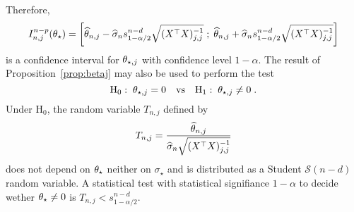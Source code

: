 Therefore, 
\[
I^{n-p}_{n,j}(\theta_{\star}) = \left[\widehat {\theta}_{n,j} -\widehat\sigma_{n}s_{1-\alpha/2}^{n-d}\sqrt{(X^\top X)_{j,j}^{-1}}\;;\; \widehat {\theta}_{n,j} + \widehat\sigma_{n}s_{1-\alpha/2}^{n-d}\sqrt{(X^\top X)_{j,j}^{-1}}\right]
\]
 is a confidence interval for $\theta_{\star,j}$ with confidence level $1-\alpha$. The result of Proposition~\ref{prop:betaj} may also be used to perform the test 
\[
\mathrm{H}_0:\; \theta_{\star,j} = 0 \quad\mathrm{vs} \quad \mathrm{H}_1:\; \theta_{\star,j} \neq 0\;.
\]
Under $\mathrm{H}_0$, the random variable $T_{n,j}$ defined by 
\[
T_{n,j} = \frac{\widehat {\theta}_{n,j}}{\widehat\sigma_{n}\sqrt{(X^\top X)_{j,j}^{-1}}} 
\] 
does not depend  on $\theta_{\star}$ neither on $\sigma_{\star}$ and is distributed as a Student $\mathcal{S}(n-d)$ random variable. A statistical test with statistical signifiance $1-\alpha$ to decide wether $\theta_{\star}\neq 0$ is $T_{n,j}<s_{1-\alpha/2}^{n-d}$. 
